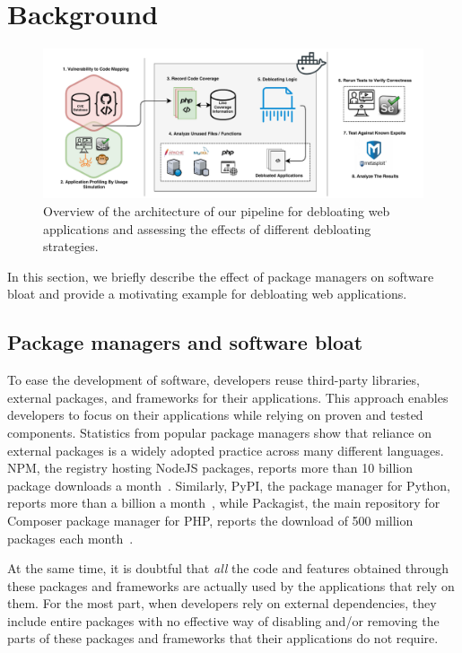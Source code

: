 \section{Background}
\label{sec:background}

\begin{figure}[t]
  \includegraphics[width=\linewidth]{figures/lim/DebloatingPipeline.pdf}
  \caption{Overview of the architecture of our pipeline for debloating web applications and assessing the effects of different debloating strategies.}
  \label{fig:debloatingpipeline}
\end{figure}

In this section, we briefly describe the effect of package managers on software
bloat and provide a motivating example for debloating web applications.


\subsection{Package managers and software bloat}
To ease the development of software, developers reuse third-party libraries,
external packages, and frameworks for their applications. This approach
enables developers to focus on their applications while relying on
proven and tested components. Statistics from popular package managers show
that reliance on external packages is a widely adopted practice across
many different languages. NPM, the registry hosting NodeJS packages,
reports more than 10 billion package downloads a
month~\cite{nodeDownloads}. Similarly, PyPI, the package manager for Python,
reports more than a billion a month~\cite{pypiDownloads}, while Packagist, the main repository for
Composer package manager for PHP, reports the download of 500 million
packages each month~\cite{packagistDownloads}.

At the same time, it is doubtful that \emph{all} the code and features
obtained through these packages and frameworks are actually used by
the applications that rely on them. For the most part, when developers rely on
external dependencies, they include entire packages with no effective way of
disabling and/or removing the parts of these packages and frameworks that
their applications do not require.

